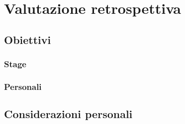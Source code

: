 \chapter{Valutazione retrospettiva}

\section{Obiettivi}

\subsection{Stage}

\subsection{Personali}

\section{Considerazioni personali}

